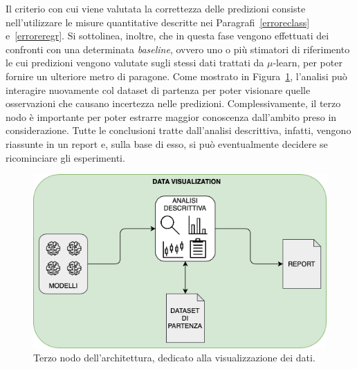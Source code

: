 \documentclass[12pt]{report}
\theoremstyle{definition}
\begin{document}
Il criterio con cui viene valutata la correttezza delle predizioni consiste nell'utilizzare le misure quantitative descritte nei Paragrafi~\ref{erroreclass} e~\ref{erroreregr}. Si sottolinea, inoltre, che in questa fase vengono effettuati dei confronti con una determinata \textit{baseline}, ovvero uno o più stimatori di riferimento le cui predizioni vengono valutate sugli stessi dati trattati da $\mu$-learn, per poter fornire un ulteriore metro di paragone. Come mostrato in Figura~\ref{datavisualization}, l'analisi può interagire nuovamente col dataset di partenza per poter visionare quelle osservazioni che causano incertezza nelle predizioni. Complessivamente, il terzo nodo è importante per poter estrarre maggior conoscenza dall'ambito preso in considerazione. Tutte le conclusioni tratte dall'analisi descrittiva, infatti, vengono riassunte in un report e, sulla base di esso, si può eventualmente decidere se ricominciare gli esperimenti.

\begin{figure}
    \centering
    \includegraphics[scale=0.6]{images/datavisualizationmodule.png}
    \caption{Terzo nodo dell'architettura, dedicato alla visualizzazione dei dati.}
    \label{datavisualization}
\end{figure}
\end{document}
